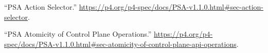 \documentclass[11pt]{article}
\begin{document}
{{\begin{thebibliography}{35}
\mdbibitemlabel{{}[20]}\textquotedblleft{}PSA Action Selector.\textquotedblright{} \href{https://p4.org/p4-spec/docs/PSA-v1.1.0.html\%23sec-action-selector}{{\ttfamily https://\hspace{0pt}p4.\hspace{0pt}org/\hspace{0pt}p4-\hspace{0pt}spec/\hspace{0pt}docs/\hspace{0pt}PSA-\hspace{0pt}v1.\hspace{0pt}1.\hspace{0pt}0.\hspace{0pt}html\#\hspace{0pt}sec-\hspace{0pt}action-\hspace{0pt}selector}}.\label{psaactionselector}%

\mdbibitemlabel{{}[21]}\textquotedblleft{}PSA Atomicity of Control Plane Operations.\textquotedblright{} \href{https://p4.org/p4-spec/docs/PSA-v1.1.0.html\%23sec-atomicity-of-control-plane-api-operations}{{\ttfamily https://\hspace{0pt}p4.\hspace{0pt}org/\hspace{0pt}p4-\hspace{0pt}spec/\hspace{0pt}docs/\hspace{0pt}PSA-\hspace{0pt}v1.\hspace{0pt}1.\hspace{0pt}0.\hspace{0pt}html\#\hspace{0pt}sec-\hspace{0pt}atomicity-\hspace{0pt}of-\hspace{0pt}control-\hspace{0pt}plane-\hspace{0pt}api-\hspace{0pt}operations}}.\label{psaatomicityofcontrolplaneops}%


\end{thebibliography}}}
\end{document}
